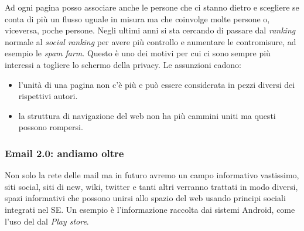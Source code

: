 					Ad ogni pagina posso associare anche le persone che ci stanno dietro e scegliere se conta di più un flusso uguale in misura ma che coinvolge molte persone o, viceversa, poche persone. Negli ultimi anni si sta cercando di passare dal \emph{ranking} normale al \emph{social ranking} per avere più controllo e aumentare le contromisure, ad esempio le \emph{spam farm}. Questo è uno dei motivi per cui ci sono sempre più interessi a togliere lo schermo della privacy.
					Le assunzioni cadono:
					\begin{itemize}
						\item l'unità di una pagina non c'è più e può essere considerata in pezzi diversi dei rispettivi autori.
						\item la struttura di navigazione del web non ha più cammini uniti ma questi possono rompersi.
					\end{itemize}
					
				\subsubsection{Email 2.0: andiamo oltre}
					Non solo la rete delle mail ma in futuro avremo un campo informativo vastissimo, siti social, siti di new, wiki, twitter e tanti altri verranno trattati in modo diversi, spazi informativi che possono unirsi allo spazio del web usando principi sociali integrati nel SE. Un esempio è l'informazione raccolta dai sistemi Android, come l'uso del dal \emph{Play store}.